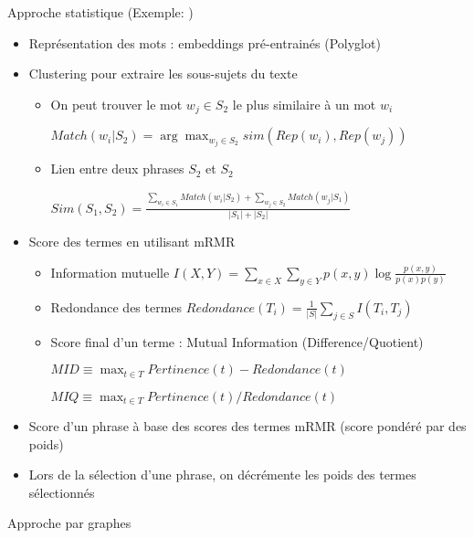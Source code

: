\documentclass{KodeBook}
\begin{document}
Approche statistique (Exemple: \cite{15-oufaida-al})

\begin{itemize}
	\item Représentation des mots : embeddings pré-entrainés (Polyglot)
	\item Clustering pour extraire les sous-sujets du texte
	\begin{itemize}
		\item On peut trouver le mot $w_j \in S_2$ le plus similaire à un mot $w_i$
		
		$Match(w_i | S_2) = \arg\max_{w_j \in S_2} sim(Rep(w_i), Rep(w_j))$
		
		\item Lien entre deux phrases $S_2$ et $S_2$
		
		$Sim(S_1, S_2) = \frac{\sum_{w_i \in S_1} Match(w_i | S_2) + \sum_{w_j \in S_2} Match(w_j | S_1)}{|S_1| + |S_2|}$
	\end{itemize}
	
	\item Score des termes en utilisant mRMR
	\begin{itemize}
		\item Information mutuelle  
		$I(X, Y) = \sum\limits_{x \in X} \sum\limits_{y \in Y} p(x, y) \log \frac{p(x, y)}{p(x) p(y)}$
		\item Redondance des termes 
		$Redondance(T_i) = \frac{1}{|S|} \sum\limits_{j \in S} I(T_i, T_j)$
		
		\item Score final d'un terme : Mutual Information (Difference/Quotient)
		
		$MID \equiv \max_{t \in T} Pertinence(t) - Redondance(t)$
		
		$MIQ \equiv \max_{t \in T} Pertinence(t) / Redondance(t)$
	\end{itemize}
	
	\item Score d'un phrase à base des scores des termes mRMR (score pondéré par des poids)
	
	\item Lors de la sélection d'une phrase, on décrémente les poids des termes sélectionnés
\end{itemize}

Approche par graphes
\end{document}
